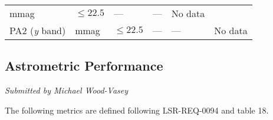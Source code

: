 \documentclass[DM,toc]{lsstdoc}
\begin{document}
\begin{longtable}[]{@{}llllll@{}}
\begin{minipage}[t]{0.06\columnwidth}
mmag\strut
\end{minipage} & \begin{minipage}[t]{0.17\columnwidth}\raggedright\strut
\(\leq 22.5\)\strut
\end{minipage} & \begin{minipage}[t]{0.17\columnwidth}\raggedright\strut
---\strut
\end{minipage} & \begin{minipage}[t]{0.12\columnwidth}\raggedright\strut
---\strut
\end{minipage} & \begin{minipage}[t]{0.17\columnwidth}\raggedright\strut
No data\strut
\end{minipage}\tabularnewline
\begin{minipage}[t]{0.14\columnwidth}\raggedright\strut
PA2 (\emph{y} band)\strut
\end{minipage} & \begin{minipage}[t]{0.06\columnwidth}\raggedright\strut
mmag\strut
\end{minipage} & \begin{minipage}[t]{0.17\columnwidth}\raggedright\strut
\(\leq 22.5\)\strut
\end{minipage} & \begin{minipage}[t]{0.17\columnwidth}\raggedright\strut
---\strut
\end{minipage} & \begin{minipage}[t]{0.12\columnwidth}\raggedright\strut
---\strut
\end{minipage} & \begin{minipage}[t]{0.17\columnwidth}\raggedright\strut
No data\strut
\end{minipage}\tabularnewline
\bottomrule
\end{longtable}

\subsection{Astrometric Performance}\label{astrometric-performance}

\emph{Submitted by Michael Wood-Vasey}

The following metrics are defined following LSR-REQ-0094
 and  table 18.
\end{document}
